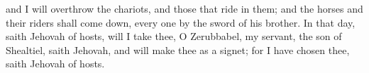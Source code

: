 and I will overthrow the chariots, and those that ride in them; and the horses and their riders shall come down, every one by the sword of his brother. In that day, saith Jehovah of hosts, will I take thee, O Zerubbabel, my servant, the son of Shealtiel, saith Jehovah, and will make thee as a signet; for I have chosen thee, saith Jehovah of hosts. 